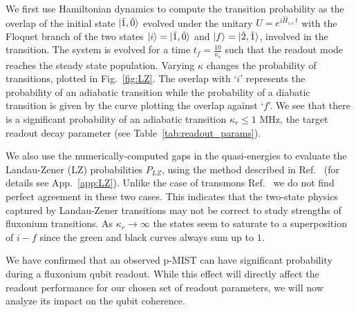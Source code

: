 \documentclass[%
reprint,
superscriptaddress,
 amsmath,amssymb,
 aps,
 prx,
longbibliography,
floatfix,
]{revtex4-2}
\begin{document}
We first use Hamiltonian dynamics to compute the transition probability as the overlap of the initial state  $\ket{\tilde{1},\tilde{0}}$ evolved under the unitary $U=e^{i\hat H_{s.c.}t}$ with the Floquet branch of the two states $\ket{i}=\ket{\tilde{1},\tilde{0}}$ and $\ket{f}=\ket{\tilde{2},\tilde{1}}$, involved in the transition. The system is evolved for a time $t_f=\frac{10}{\kappa_r}$ such that the readout mode reaches the steady state population. Varying $\kappa$ changes the probability of transitions, plotted in Fig.~\ref{fig:LZ}. The overlap with `$i$' represents the probability of an adiabatic transition while the probability of a diabatic transition is given by the curve plotting the overlap against `$f$'. We see that there is a significant probability of an adiabatic transition $\kappa_r\le 1$ MHz, the target readout decay parameter (see Table~\ref{tab:readout_params}). 

We also use the numerically-computed gaps in the quasi-energies to evaluate the Landau-Zener (LZ) probabilities $P_{LZ}$, using the method described in Ref.~\cite{ikeda2022floquet} (for details see App.~\ref{app:LZ}). Unlike the case of transmons Ref.~\cite{dumas2024unified} we do not find perfect agreement in these two cases. This indicates that the two-state physics captured by Landau-Zener transitions may not be correct to study strengths of fluxonium transitions. As $\kappa_r\rightarrow \infty$ the states seem to saturate to a superposition of $i-f$ since the green and black curves always sum up to $1$.

We have confirmed that an observed p-MIST can have significant probability during a fluxonium qubit readout. While this effect will directly affect the readout performance for our chosen set of readout parameters, we will now analyze its impact on the qubit coherence.
\end{document}
